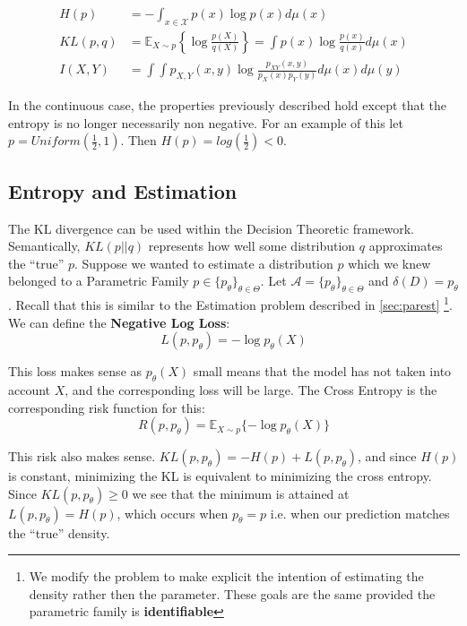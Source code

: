 \documentclass[]{article}
\theoremstyle{mattstyle}
\theoremstyle{definition}
\begin{document}
\begin{align}
H(p) &= -\int_{x\in\mathcal{X}}p(x)\log p(x)d\mu(x) \\
KL(p,q) &= \mathbb{E}_{X\sim p}\left\{\log \frac{p(X)}{q(X)}\right\} = \int p(x)\log\frac{p(x)}{q(x)}d\mu(x)\\
I(X,Y) &=\int\int p_{X,Y}(x,y)\log\frac{p_{XY}(x,y)}{p_X(x)p_Y(y)}d\mu(x)d\mu(y)
\end{align}

In the continuous case, the properties previously described hold except that the entropy is no longer necessarily non negative. For an example of this let $p = Uniform\left(\frac{1}{2},1\right)$. Then $H(p) = log(\frac{1}{2}) < 0$.

\subsection{Entropy and Estimation}

The KL divergence can be used within the Decision Theoretic framework. Semantically, $KL(p||q)$ represents how well some distribution $q$ approximates the ``true'' $p$. Suppose we wanted to estimate a distribution $p$ which we knew belonged to a Parametric Family  $p\in \{p_{\theta}\}_{\theta\in\Theta}$. Let \(\mathcal{A} = \{p_{\theta}\}_{\theta\in\Theta}\) and $\delta(D)=p_{\theta}$. Recall that this is similar to the Estimation problem described in \ref{sec:parest} \footnote{We modify the problem to make explicit the intention of estimating the density rather then the parameter. These goals are the same provided the parametric family is \textbf{identifiable}}.  We can define the \textbf{Negative Log Loss}:
\begin{equation}
L(p,p_{\theta}) = -\log p_{\theta}(X)
\end{equation}

This loss makes sense as $p_{\theta}(X)$ small means that the model has not taken into account $X$, and the corresponding loss will be large. The Cross Entropy is the corresponding risk function for this:
\begin{equation}\label{eq:celf}
R(p,p_{\theta}) = \mathbb{E}_{X\sim p}\{ -\log p_{\theta}(X) \}
\end{equation}	

This risk also makes sense. $KL(p,p_{\theta}) = -H(p) + L(p,p_{\theta})$, and since $H(p)$ is constant, minimizing the KL is equivalent to minimizing the cross entropy. Since $KL(p,p_{\theta}) \ge 0$ we see that the minimum is attained at $L(p,p_{\theta}) = H(p)$, which occurs when $p_{\theta}=p$ i.e. when our prediction matches the ``true'' density.
\end{document}
